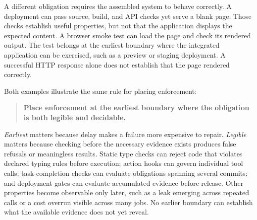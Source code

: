 A different obligation requires the assembled system to behave correctly. A deployment can pass source, build, and API checks yet serve a blank page. Those checks establish useful properties, but not that the application displays the expected content. A browser smoke test can load the page and check its rendered output. The test belongs at the earliest boundary where the integrated application can be exercised, such as a preview or staging deployment. A successful HTTP response alone does not establish that the page rendered correctly.






Both examples illustrate the same rule for placing enforcement:

\begin{quote}
\textbf{Place enforcement at the earliest boundary where the obligation is both legible and decidable.}
\end{quote}

\emph{Earliest} matters because delay makes a failure more expensive to repair. \emph{Legible} matters because checking before the necessary evidence exists produces false refusals or meaningless results. Static type checks can reject code that violates declared typing rules before execution; action hooks can govern individual tool calls; task-completion checks can evaluate obligations spanning several commits; and deployment gates can evaluate accumulated evidence before release. Other properties become observable only later, such as a leak emerging across repeated calls or a cost overrun visible across many jobs. No earlier boundary can establish what the available evidence does not yet reveal.

